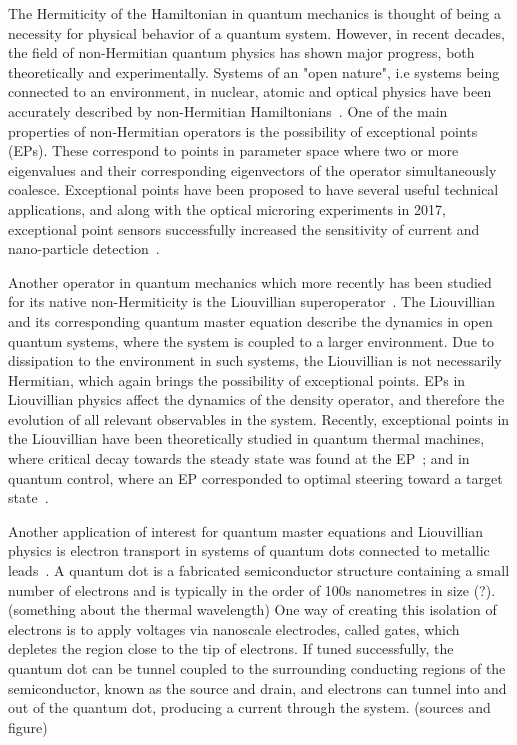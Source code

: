 \documentclass[../main.tex]{subfiles}
\begin{document}
The Hermiticity of the Hamiltonian in quantum mechanics is thought of being a necessity for physical behavior of a quantum system. However, in recent decades, the field of non-Hermitian quantum physics has shown major progress, both theoretically and experimentally. Systems of an "open nature", i.e systems being connected to an environment, in nuclear, atomic and optical physics have been accurately described by non-Hermitian Hamiltonians~\cite{nonHermrev}. One of the main properties of non-Hermitian operators is the possibility of exceptional points (EPs). These correspond to points in parameter space where two or more eigenvalues and their corresponding eigenvectors of the operator simultaneously coalesce. Exceptional points have been proposed to have several useful technical applications, and along with the optical microring experiments in 2017, exceptional point sensors successfully increased the sensitivity of current and nano-particle detection~\cite{microring1, microring2}.

Another operator in quantum mechanics which more recently has been studied for its native non-Hermiticity is the Liouvillian superoperator~\cite{recentliou, thermal, steering}. The Liouvillian and its corresponding quantum master equation describe the dynamics in open quantum systems, where the system is coupled to a larger environment. Due to dissipation to the environment in such systems, the Liouvillian is not necessarily Hermitian, which again brings the possibility of exceptional points. EPs in Liouvillian physics affect the dynamics of the density operator, and therefore the evolution of all relevant observables in the system. Recently, exceptional points in the Liouvillian have been theoretically studied in quantum thermal machines, where critical decay towards the steady state was found at the EP~\cite{thermal}; and in quantum control, where an EP corresponded to optimal steering toward a target state~\cite{steering}. 

Another application of interest for quantum master equations and Liouvillian physics is electron transport in systems of quantum dots connected to metallic leads~\cite{qdottrans}. A quantum dot is a fabricated semiconductor structure containing a small number of electrons and is typically in the order of 100s nanometres in size (?). (something about the thermal wavelength) One way of creating this isolation of electrons is to apply voltages via nanoscale electrodes, called gates, which depletes the region close to the tip of electrons. If tuned successfully, the quantum dot can be tunnel coupled to the surrounding conducting regions of the semiconductor, known as the source and drain, and electrons can tunnel into and out of the quantum dot, producing a current through the system. (sources and figure)
\end{document}
